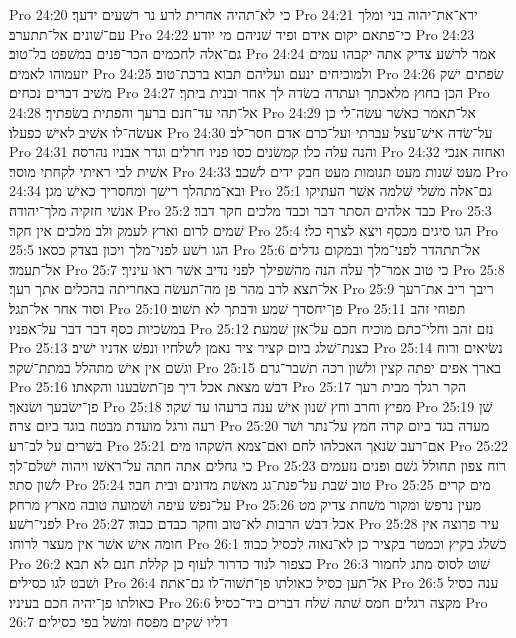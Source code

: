 Pro 24:20  כי לא־תהיה אחרית לרע נר רשׁעים ידעך׃
Pro 24:21  ירא־את־יהוה בני ומלך עם־שׁונים אל־תתערב׃
Pro 24:22  כי־פתאם יקום אידם ופיד שׁניהם מי יודע׃
Pro 24:23  גם־אלה לחכמים הכר־פנים במשׁפט בל־טוב׃
Pro 24:24  אמר לרשׁע צדיק אתה יקבהו עמים יזעמוהו לאמים׃
Pro 24:25  ולמוכיחים ינעם ועליהם תבוא ברכת־טוב׃
Pro 24:26  שׂפתים ישׁק משׁיב דברים נכחים׃
Pro 24:27  הכן בחוץ מלאכתך ועתדה בשׂדה לך אחר ובנית ביתך׃
Pro 24:28  אל־תהי עד־חנם ברעך והפתית בשׂפתיך׃
Pro 24:29  אל־תאמר כאשׁר עשׂה־לי כן אעשׂה־לו אשׁיב לאישׁ כפעלו׃
Pro 24:30  על־שׂדה אישׁ־עצל עברתי ועל־כרם אדם חסר־לב׃
Pro 24:31  והנה עלה כלו קמשׂנים כסו פניו חרלים וגדר אבניו נהרסה׃
Pro 24:32  ואחזה אנכי אשׁית לבי ראיתי לקחתי מוסר׃
Pro 24:33  מעט שׁנות מעט תנומות מעט חבק ידים לשׁכב׃
Pro 24:34  ובא־מתהלך רישׁך ומחסריך כאישׁ מגן׃
Pro 25:1  גם־אלה משׁלי שׁלמה אשׁר העתיקו אנשׁי חזקיה מלך־יהודה׃
Pro 25:2  כבד אלהים הסתר דבר וכבד מלכים חקר דבר׃
Pro 25:3  שׁמים לרום וארץ לעמק ולב מלכים אין חקר׃
Pro 25:4  הגו סיגים מכסף ויצא לצרף כלי׃
Pro 25:5  הגו רשׁע לפני־מלך ויכון בצדק כסאו׃
Pro 25:6  אל־תתהדר לפני־מלך ובמקום גדלים אל־תעמד׃
Pro 25:7  כי טוב אמר־לך עלה הנה מהשׁפילך לפני נדיב אשׁר ראו עיניך׃
Pro 25:8  אל־תצא לרב מהר פן מה־תעשׂה באחריתה בהכלים אתך רעך׃
Pro 25:9  ריבך ריב את־רעך וסוד אחר אל־תגל׃
Pro 25:10  פן־יחסדך שׁמע ודבתך לא תשׁוב׃
Pro 25:11  תפוחי זהב במשׂכיות כסף דבר דבר על־אפניו׃
Pro 25:12  נזם זהב וחלי־כתם מוכיח חכם על־אזן שׁמעת׃
Pro 25:13  כצנת־שׁלג ביום קציר ציר נאמן לשׁלחיו ונפשׁ אדניו ישׁיב׃
Pro 25:14  נשׂיאים ורוח וגשׁם אין אישׁ מתהלל במתת־שׁקר׃
Pro 25:15  בארך אפים יפתה קצין ולשׁון רכה תשׁבר־גרם׃
Pro 25:16  דבשׁ מצאת אכל דיך פן־תשׂבענו והקאתו׃
Pro 25:17  הקר רגלך מבית רעך פן־ישׂבעך ושׂנאך׃
Pro 25:18  מפיץ וחרב וחץ שׁנון אישׁ ענה ברעהו עד שׁקר׃
Pro 25:19  שׁן רעה ורגל מועדת מבטח בוגד ביום צרה׃
Pro 25:20  מעדה בגד ביום קרה חמץ על־נתר ושׁר בשׁרים על לב־רע׃
Pro 25:21  אם־רעב שׂנאך האכלהו לחם ואם־צמא השׁקהו מים׃
Pro 25:22  כי גחלים אתה חתה על־ראשׁו ויהוה ישׁלם־לך׃
Pro 25:23  רוח צפון תחולל גשׁם ופנים נזעמים לשׁון סתר׃
Pro 25:24  טוב שׁבת על־פנת־גג מאשׁת מדונים ובית חבר׃
Pro 25:25  מים קרים על־נפשׁ עיפה ושׁמועה טובה מארץ מרחק׃
Pro 25:26  מעין נרפשׂ ומקור משׁחת צדיק מט לפני־רשׁע׃
Pro 25:27  אכל דבשׁ הרבות לא־טוב וחקר כבדם כבוד׃
Pro 25:28  עיר פרוצה אין חומה אישׁ אשׁר אין מעצר לרוחו׃
Pro 26:1  כשׁלג בקיץ וכמטר בקציר כן לא־נאוה לכסיל כבוד׃
Pro 26:2  כצפור לנוד כדרור לעוף כן קללת חנם לא תבא׃
Pro 26:3  שׁוט לסוס מתג לחמור ושׁבט לגו כסילים׃
Pro 26:4  אל־תען כסיל כאולתו פן־תשׁוה־לו גם־אתה׃
Pro 26:5  ענה כסיל כאולתו פן־יהיה חכם בעיניו׃
Pro 26:6  מקצה רגלים חמס שׁתה שׁלח דברים ביד־כסיל׃
Pro 26:7  דליו שׁקים מפסח ומשׁל בפי כסילים׃
